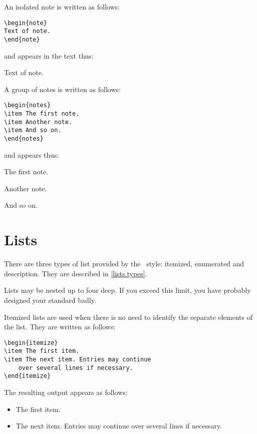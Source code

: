 An isolated note is written as follows:
\begin{verbatim}
\begin{note}
Text of note.
\end{note}
\end{verbatim}
and appears in the text thus:
\begin{note}
Text of note.
\end{note}

A group of notes is written as follows:
\begin{verbatim}
\begin{notes}
\item The first note.
\item Another note.
\item And so on.
\end{notes}
\end{verbatim}
and appears thus:
\begin{notes}
\item The first note.
\item Another note.
\item And so on.
\end{notes}

\section{Lists}
There are three types of list provided by the \iso\ style: itemized,
enumerated and description.
They are described in \ref{lists.types}.

Lists may be nested up to four deep.
If you exceed this limit, you have probably designed your standard badly.

\label{lists.types}
Itemized lists are used when there is no need to identify the separate
elements of the list.
They are written as follows:
\begin{verbatim}
\begin{itemize}
\item The first item.
\item The next item. Entries may continue
    over several lines if necessary.
\end{itemize}
\end{verbatim}
The resulting output appears as follows:
\begin{itemize}
\item The first item.
\item The next item. Entries may continue
    over several lines if necessary.
\end{itemize}


